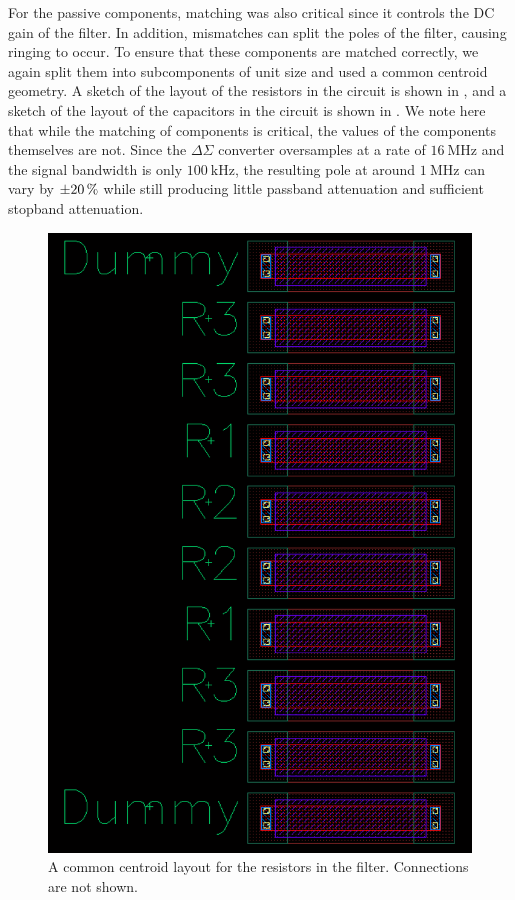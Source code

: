 \documentclass[journal,hidelinks]{IEEEtran}
\begin{document}
For the passive components, matching was also critical since it controls the DC gain of the filter. In addition, mismatches can split the poles of the filter, causing ringing to occur. To ensure that these components are matched correctly, we again split them into subcomponents of unit size and used a common centroid geometry. A sketch of the layout of the resistors in the circuit is shown in , and a sketch of the layout of the capacitors in the circuit is shown in .
We note here that while the matching of components is critical, the values of the components themselves are not. Since the $\Delta \Sigma$ converter oversamples at a rate of $\SI{16}{\mega\hertz}$ and the signal bandwidth is only $\SI{100}{\kilo\hertz}$, the resulting pole at around $\SI{1}{\mega\hertz}$ can vary by $\SI{\pm 20}{\percent}$ while still producing little passband attenuation and sufficient stopband attenuation.

\begin{figure}[!htb]
  \centering
  \includegraphics[width=\columnwidth]{layout/res.png}
  \caption{A common centroid layout for the resistors in the filter. Connections are not shown.}
  \label{fig:layout_res}
\end{figure}
\end{document}
